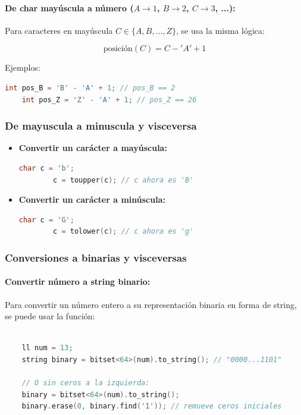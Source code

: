 \paragraph{De char mayúscula a número ($A \to 1$, $B \to 2$, $C \to 3$, ...):}
Para caracteres en mayúscula \( C \in \{A, B, \dots, Z\} \), se usa la misma lógica:

\[
\text{posición}(C) = C - 'A' + 1
\]

Ejemplos:
\begin{lstlisting}[language=C++]
	int pos_B = 'B' - 'A' + 1; // pos_B == 2
	int pos_Z = 'Z' - 'A' + 1; // pos_Z == 26
\end{lstlisting}

\subsubsection{De mayuscula a minuscula y visceversa}


\begin{itemize}
	\item \textbf{Convertir un carácter a mayúscula:}
	\begin{lstlisting}[language=C++]
		char c = 'b';
		c = toupper(c); // c ahora es 'B'
	\end{lstlisting}
	
	\item \textbf{Convertir un carácter a minúscula:}
	\begin{lstlisting}[language=C++]
		char c = 'G';
		c = tolower(c); // c ahora es 'g'
	\end{lstlisting}
\end{itemize}

\subsubsection{Conversiones a binarias y visceversas}

\paragraph{Convertir número a string binario:}
Para convertir un número entero a su representación binaria en forma de string, se puede usar la función:

\begin{lstlisting}[language=C++]
	
	ll num = 13;
	string binary = bitset<64>(num).to_string(); // "0000...1101"
	
	// O sin ceros a la izquierda:
	binary = bitset<64>(num).to_string();
	binary.erase(0, binary.find('1')); // remueve ceros iniciales
\end{lstlisting}

